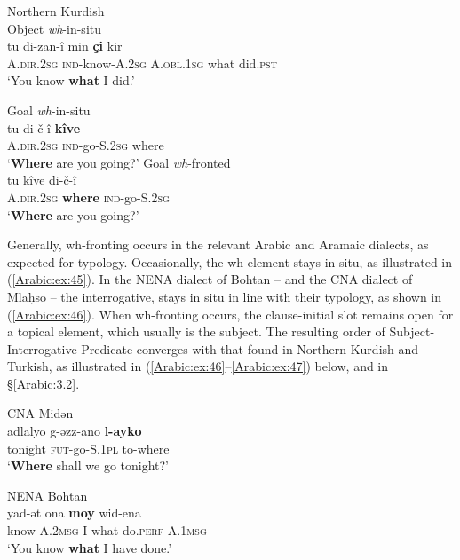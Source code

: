 \documentclass[output=paper,colorlinks,citecolor=brown,draftmode]{langscibook}
\begin{document}
%

\ea\label{Arabic:ex:44}
Northern Kurdish\\
\ea\label{Arabic:ex:44a}
Object \textit{wh}-in-situ\\
\gll tu di-zan-î min \textbf{çi} kir \\
\textsc{A.dir.2sg} \textsc{ind-}know\textsc{-A.2sg} \textsc{A.obl.1sg} what did\textsc{.pst} \\
\glt `You know \textbf{what} I did.'

\ex\label{Arabic:ex:44b}
Goal \textit{wh}-in-situ\\
\gll tu di-č-î \textbf{kîve} \\
\textsc{A.dir.2sg} \textsc{ind-}go\textsc{-S.2sg} where \\
\glt `\textbf{Where} are you going?'
\ex\label{Arabic:ex:44c}
Goal \textit{wh}-fronted\\
\gll tu kîve di-č-î \\
\textsc{A.dir.2sg} \textbf{where} \textsc{ind}-go-\textsc{S.2sg} \\
\glt `\textbf{Where} are you going?'
\z
\z

\begin{sloppypar}
Generally, wh-fronting occurs in the relevant Arabic and Aramaic dialects, as expected for  typology. Occasionally, the wh-element stays in situ, as illustrated in (\ref{Arabic:ex:45}). In the NENA dialect of Bohtan -- and the CNA dialect of Mlaḥso -- the  interrogative, stays in situ in line with their  typology, as shown in (\ref{Arabic:ex:46}).  When wh-fronting occurs, the clause-initial slot remains open for a topical element, which usually is the subject. The resulting order of Subject-Interrogative-Predicate converges with that found in Northern Kurdish and Turkish, as illustrated in (\ref{Arabic:ex:46}--\ref{Arabic:ex:47}) below, and in §\ref{Arabic:3.2}.
\end{sloppypar}


\ea\label{Arabic:ex:45}
CNA Midən \citep[115:§7]{Ritter1967Turoyo} \\
\gll adlalyo g-əzz-ano \textbf{l-ayko}  \\
tonight \textsc{fut-}go\textsc{-S.1pl} to-where\\
\glt `\textbf{Where} shall we go tonight?' 
\z


\ea\label{Arabic:ex:46}
NENA Bohtan \citep[4.3:§38]{Fox2009NABohtan}\\
\gll yad-ǝt ona \textbf{moy} wid-ena \\
know\textsc{-A.2msg} I what do\textsc{.perf-A.1msg} \\
\glt `You know \textbf{what} I have done.'
\z
\end{document}
